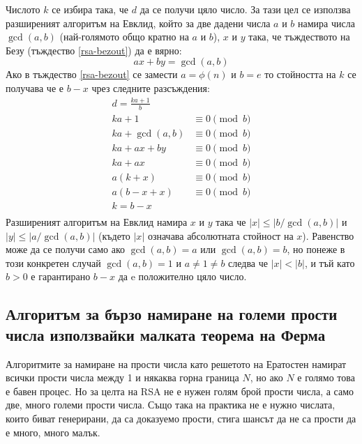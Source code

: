   Числото $k$ се избира така, че $d$ да се получи цяло число. За тази цел се използва разширеният алгоритъм на Евклид, който за две дадени числа $a$ и $b$ намира числа $\gcd(a,b)$ (най-голямото общо кратно на $a$ и $b$), $x$ и $y$ така, че тъждеството на Безу (тъждество \ref{rsa-bezout}) да е вярно:
  \begin{equation}
    ax+by = \gcd(a,b)
    \label{rsa-bezout}
  \end{equation}
  Ако в тъждество \ref{rsa-bezout} се замести $a=\phi(n)$ и $b=e$ то стойността на $k$ се получава че е $b-x$ чрез следните разсъждения:
  \begin{equation}
    \begin{alignedat}{1}
      d = \frac{ka+1}{b} \\
      ka + 1 &\equiv 0 \pmod{b} \\
      ka + \gcd(a,b) &\equiv 0 \pmod{b} \\
      ka + ax + by &\equiv 0 \pmod{b} \\
      ka + ax &\equiv 0 \pmod{b} \\
      a(k+x) &\equiv 0 \pmod{b} \\
      a(b-x+x) &\equiv 0 \pmod{b} \\
      k = b - x \\
    \end{alignedat}
    \label{rsa-finding-k}
  \end{equation}
  Разширеният алгоритъм на Евклид намира $x$ и $y$ така че $|x|\leq|b/\gcd(a,b)|$ и $|y|\leq|a/\gcd(a,b)|$ (където $|x|$ означава абсолютната стойност на $x$). Равенство може да се получи само ако $\gcd(a,b)=a$ или $\gcd(a,b)=b$, но понеже в този конкретен случай $\gcd(a,b)=1$ и $a \neq 1 \neq b$ следва че $|x|<|b|$, и тъй като $b>0$ е гарантирано $b-x$ да e положително цяло число.

  \subsection{Алгоритъм за бързо намиране на големи прости числа използвайки малката теорема на Ферма} \label{primesalgo}
  Алгоритмите за намиране на прости числа като решетото на Ератостен\cite{primesieve} намират всички прости числа между 1 и някаква горна граница $N$, но ако $N$ е голямо това е бавен процес. Но за целта на RSA не е нужен голям брой прости числа, а само две, много големи прости числа. Също така на практика не е нужно числата, които биват генерирани, да са доказуемо прости, стига шансът да не са прости да е много, много малък.


